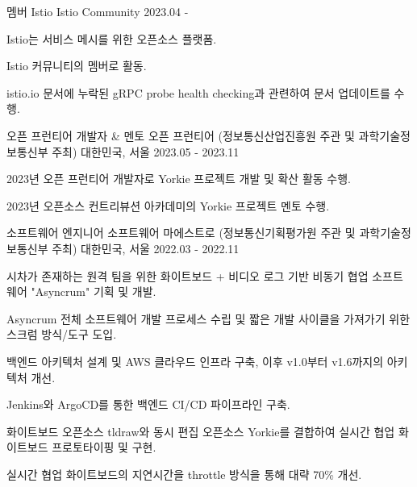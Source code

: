 \begin{cventries}
  \cventry
    {멤버} %
    {Istio} %
    {Istio Community} %
    {2023.04 - } %
    {
      \begin{cvitems} %
        \item {Istio는 서비스 메시를 위한 오픈소스 플랫폼.}
        \item {Istio 커뮤니티의 멤버로 활동.}
        \item {istio.io 문서에 누락된 gRPC probe health checking과 관련하여 문서 업데이트를 수행.}
      \end{cvitems}
    }

\cventry
    {오픈 프런티어 개발자 \& 멘토} %
    {오픈 프런티어 (정보통신산업진흥원 주관 및 과학기술정보통신부 주최)} %
    {대한민국, 서울} %
    {2023.05 - 2023.11} %
    {
      \begin{cvitems} %
        \item {2023년 오픈 프런티어 개발자로 Yorkie 프로젝트 개발 및 확산 활동 수행.}
        \item {2023년 오픈소스 컨트리뷰션 아카데미의 Yorkie 프로젝트 멘토 수행.}
      \end{cvitems}
    }
    
  \cventry
    {소프트웨어 엔지니어} %
    {소프트웨어 마에스트로 (정보통신기획평가원 주관 및 과학기술정보통신부 주최)} %
    {대한민국, 서울} %
    {2022.03 - 2022.11} %
    {
      \begin{cvitems} %
        \item {시차가 존재하는 원격 팀을 위한 화이트보드 + 비디오 로그 기반 비동기 협업 소프트웨어 "Asyncrum" 기획 및 개발.}
        \item {Asyncrum 전체 소프트웨어 개발 프로세스 수립 및 짧은 개발 사이클을 가져가기 위한 스크럼 방식/도구 도입}.
        \item {백엔드 아키텍처 설계 및 AWS 클라우드 인프라 구축, 이후 v1.0부터 v1.6까지의 아키텍처 개선.}
        \item {Jenkins와 ArgoCD를 통한 백엔드 CI/CD 파이프라인 구축.}
        \item {화이트보드 오픈소스 tldraw와 동시 편집 오픈소스 Yorkie를 결합하여 실시간 협업 화이트보드 프로토타이핑 및 구현.}     
        \item {실시간 협업 화이트보드의 지연시간을 throttle 방식을 통해 대략 70\% 개선.}    
      \end{cvitems}
    }


\end{cventries}
